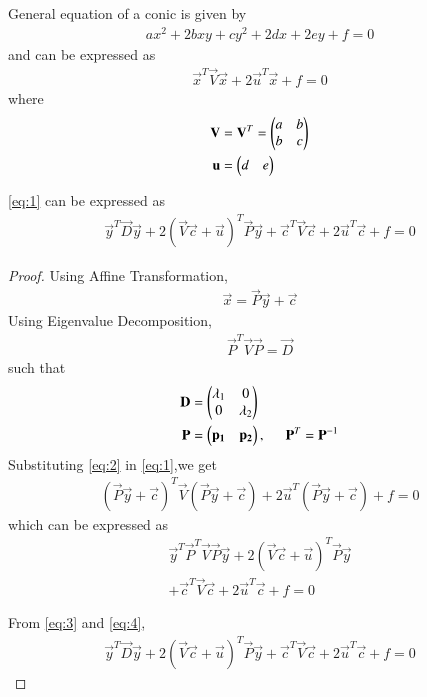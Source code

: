 \documentclass[journal,12pt,twocolumn]{IEEEtran}
\begin{document}
\clearpage
\begin{theorem}
General equation of a conic is given by
\begin{align}
ax^2+2bxy+cy^2+2dx+2ey+f=0 \label{eq:15}
\end{align}
and can be expressed as 
\begin{align}
    \vec{x}^T\vec{V}\vec{x} + 2\vec{u}^T\vec{x} + f = 0 \label{eq:1}
\end{align}
where
\begin{align}
    \mathbf{V}&=\mathbf{V}^T=\begin{pmatrix}a & b\\b & c\end{pmatrix}
    \\
    \mathbf{u}&=\begin{pmatrix}d & e\end{pmatrix}
\end{align}
\end{theorem}
\begin{theorem}
\eqref{eq:1} can be expressed as 
\begin{align}
    \vec{y}^T\vec{D}\vec{y} + 2(\vec{V}\vec{c} + \vec{u})^T \vec{P}\vec{y} + \vec{c}^T\vec{V}\vec{c} + 2\vec{u}^T\vec{c} + f = 0 \label{eq:22}
\end{align}
\end{theorem}
\begin{proof}
Using Affine Transformation,
\begin{align}
    \vec{x}=\vec{P}\vec{y}+\vec{c} \label{eq:2}
\end{align}
Using Eigenvalue Decomposition,
\begin{align}
    \vec{P}^T\vec{V}\vec{P}=\vec{D} \label{eq:4}
\end{align}
such that
\begin{align}
    \mathbf{D} &= \begin{pmatrix}\lambda_1 & 0 \\ 0 & \lambda_2\end{pmatrix}
    \\
    \mathbf{P} &= \begin{pmatrix}\mathbf{p_1} & \mathbf{p_2}\end{pmatrix},\hspace{0.5cm}
    \mathbf{P}^T = \mathbf{P}^{-1} \label{eq:5}
\end{align}
Substituting \eqref{eq:2} in \eqref{eq:1},we get
\begin{align}
    (\vec{P}\vec{y}+\vec{c})^T\vec{V}(\vec{P}\vec{y}+\vec{c}) + 2\vec{u}^T(\vec{P}\vec{y}+\vec{c}) + f = 0
\end{align}
which can be expressed as
\begin{multline}
\vec{y}^T\vec{P}^T\vec{V}\vec{P}\vec{y} + 2(\vec{V}\vec{c} + \vec{u})^T \vec{P}\vec{y}\\
+ \vec{c}^T\vec{V}\vec{c} + 2\vec{u}^T\vec{c} + f = 0 \label{eq:3}
\end{multline}

From \eqref{eq:3} and \eqref{eq:4},
\begin{align}
    \vec{y}^T\vec{D}\vec{y} + 2(\vec{V}\vec{c} + \vec{u})^T \vec{P}\vec{y} + \vec{c}^T\vec{V}\vec{c} + 2\vec{u}^T\vec{c} + f = 0
\end{align}
\end{proof}
\end{document}
